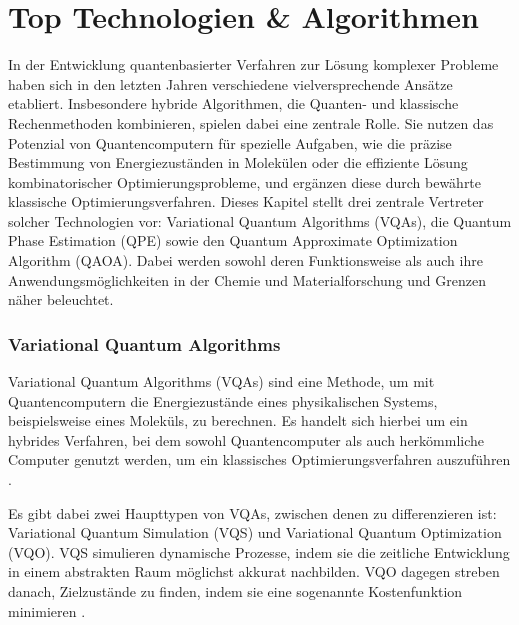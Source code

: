 \section{Top Technologien \& Algorithmen}
In der Entwicklung quantenbasierter Verfahren zur Lösung komplexer Probleme haben sich in den letzten Jahren verschiedene vielversprechende Ansätze etabliert. Insbesondere hybride Algorithmen, die Quanten- und klassische Rechenmethoden kombinieren, spielen dabei eine zentrale Rolle. Sie nutzen das Potenzial von Quantencomputern für spezielle Aufgaben, wie die präzise Bestimmung von Energiezuständen in Molekülen oder die effiziente Lösung kombinatorischer Optimierungsprobleme, und ergänzen diese durch bewährte klassische Optimierungsverfahren.
\vspace{1em}
Dieses Kapitel stellt drei zentrale Vertreter solcher Technologien vor: Variational Quantum Algorithms (VQAs), die Quantum Phase Estimation (QPE) sowie den Quantum Approximate Optimization Algorithm (QAOA). Dabei werden sowohl deren Funktionsweise als auch ihre Anwendungsmöglichkeiten in der Chemie und Materialforschung und Grenzen näher beleuchtet.



\subsubsection*{Variational Quantum Algorithms}

Variational Quantum Algorithms (VQAs) sind eine Methode, um mit Quantencomputern die Energiezustände eines physikalischen Systems, beispielsweise eines Moleküls, zu berechnen. Es handelt sich hierbei um ein hybrides Verfahren, bei dem sowohl Quantencomputer als auch herkömmliche Computer genutzt werden, um ein klassisches Optimierungsverfahren auszuführen \citealp[6]{weidmanQuantumComputingChemistry2024a}.

Es gibt dabei zwei Haupttypen von VQAs, zwischen denen zu differenzieren ist: Variational Quantum Simulation (VQS) und Variational Quantum Optimization (VQO). VQS simulieren dynamische Prozesse, indem sie die zeitliche Entwicklung in einem abstrakten Raum möglichst akkurat nachbilden. VQO dagegen streben danach, Zielzustände zu finden, indem sie eine sogenannte Kostenfunktion minimieren \citealp[23]{mottaEmergingQuantumComputing2022}.


